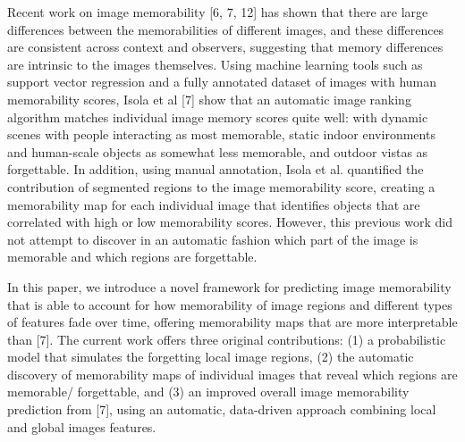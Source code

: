 Recent work on image memorability [6, 7, 12] has shown that there are large differences between the memorabilities of different images, and these differences are consistent across context and observers, suggesting that memory differences are intrinsic to the images themselves. Using machine learning tools such as support vector regression and a fully annotated dataset of images with human memorability scores, Isola et al [7] show that an automatic image ranking algorithm matches individual image memory scores quite well: with dynamic scenes with people interacting as most memorable, static indoor environments and human-scale objects as somewhat less memorable, and outdoor vistas as forgettable. In addition, using manual annotation, Isola et al. quantified the contribution of segmented regions to the image memorability score, creating a memorability map for each individual image that identifies objects that are correlated with high or low memorability scores. However, this previous work did not attempt to discover in an automatic fashion which part of the
image is memorable and which regions are forgettable.

In this paper, we introduce a novel framework for predicting image memorability that is able to
account for how memorability of image regions and different types of features fade over time, offering memorability maps that are more interpretable than [7]. The current work offers three original contributions: (1) a probabilistic model that simulates the forgetting local image regions, (2) the automatic discovery of memorability maps of individual images that reveal which regions are memorable/ forgettable, and (3) an improved overall image memorability prediction from [7], using an automatic, data-driven approach combining local and global images features. 